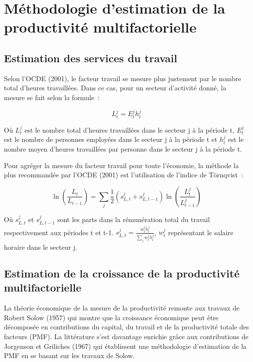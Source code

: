 \documentclass[12pt,a4paper,oneside]{report}
\begin{document}
\section{Méthodologie d’estimation de la productivité multifactorielle}

\subsection{Estimation des services du travail}

Selon l’OCDE (2001), le facteur travail se mesure plus justement par le nombre total d’heures travaillées.
Dans ce cas, pour un secteur d’activité donné, la mesure se fait selon la formule~:

\[
{L}_{t}^{j}={E}_{t}^{j}{h}_{t}^{j}
\]

Où \({L}_{t}^{j}\) est le nombre total d’heures travaillées dans le secteur j à la période t, \({E}_{t}^{j}\)
est le nombre de personnes employées dans le secteur j à la période t et \({h}_{t}^{j}\) est le nombre moyen
d’heures travaillées par personne dans le secteur j à la période t.

Pour agréger la mesure du facteur travail pour toute l’économie, la méthode la plus recommandée par l’OCDE
(2001) est l’utilisation de l’indice de Törnqvist~:

\[
\ln \left( \frac{{L}_{t}}{{L}_{t-1}}\right)=\sum_{j} \frac{1}{2}({s}_{L,t}^{j}+{s}_{L,t-1}^{j})\ln(\frac{{L}_{t}^{j}}{{L}_{t-1}^{j}})
\]

Où \({s}_{L,t}^{j}\) et \({s}_{L,t-1}^{j}\) sont les parts dans la rémunération total du travail
respectivement aux périodes t et t-1. \({s}_{L,t}^{j}=\frac{{w}_{t}^{j}{h}_{t}^{j}}{\sum_{j}
{w}_{t}^{j}{h}_{t}^{j}}\), \({w}_{t}^{j}\) représentant le salaire horaire dans le secteur j.

\subsection{Estimation de la croissance de la productivité multifactorielle}

La théorie économique de la mesure de la productivité remonte aux travaux de Robert Solow (1957) qui montre
que la croissance économique peut être décomposée en contributions du capital, du travail et de la
productivité totale des facteurs (PMF). La littérature s’est davantage enrichie grâce aux contributions de
Jorgenson et Griliches (1967) qui établissent une méthodologie d’estimation de la PMF en se basant sur les
travaux de Solow.
\end{document}

